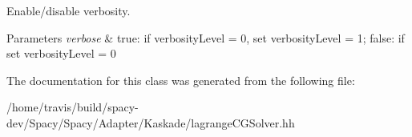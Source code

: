 Enable/disable verbosity. 


\begin{DoxyParams}{Parameters}
{\em verbose} & true\-: if verbosity\-Level = 0, set verbosity\-Level = 1; false\-: if set verbosity\-Level = 0 \\
\hline
\end{DoxyParams}


The documentation for this class was generated from the following file\-:\begin{DoxyCompactItemize}
\item 
/home/travis/build/spacy-\/dev/\-Spacy/\-Spacy/\-Adapter/\-Kaskade/lagrange\-C\-G\-Solver.\-hh\end{DoxyCompactItemize}
